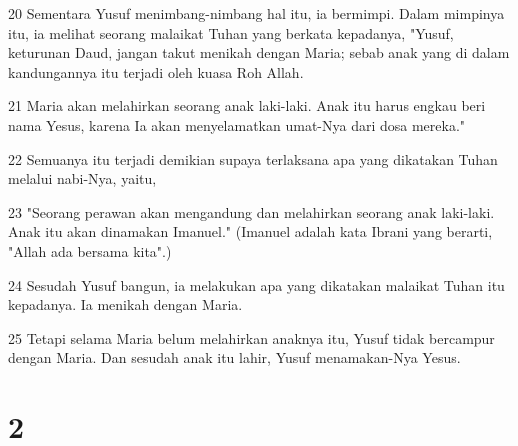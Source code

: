 \par 20 Sementara Yusuf menimbang-nimbang hal itu, ia bermimpi. Dalam mimpinya itu, ia melihat seorang malaikat Tuhan yang berkata kepadanya, "Yusuf, keturunan Daud, jangan takut menikah dengan Maria; sebab anak yang di dalam kandungannya itu terjadi oleh kuasa Roh Allah.
\par 21 Maria akan melahirkan seorang anak laki-laki. Anak itu harus engkau beri nama Yesus, karena Ia akan menyelamatkan umat-Nya dari dosa mereka."
\par 22 Semuanya itu terjadi demikian supaya terlaksana apa yang dikatakan Tuhan melalui nabi-Nya, yaitu,
\par 23 "Seorang perawan akan mengandung dan melahirkan seorang anak laki-laki. Anak itu akan dinamakan Imanuel." (Imanuel adalah kata Ibrani yang berarti, "Allah ada bersama kita".)
\par 24 Sesudah Yusuf bangun, ia melakukan apa yang dikatakan malaikat Tuhan itu kepadanya. Ia menikah dengan Maria.
\par 25 Tetapi selama Maria belum melahirkan anaknya itu, Yusuf tidak bercampur dengan Maria. Dan sesudah anak itu lahir, Yusuf menamakan-Nya Yesus.

\chapter{2}

